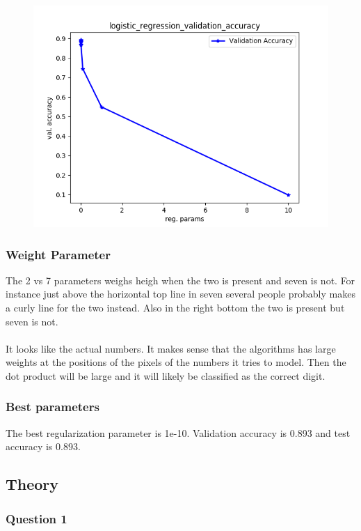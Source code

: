 \documentclass[paper=a4, fontsize=11pt]{scrartcl} %
\numberwithin{equation}{section} %
\numberwithin{figure}{section} %
\numberwithin{table}{section} %
\begin{document}
\begin{figure}[h]
\center
\includegraphics[]{logistic_regression_validation_accuracy.png}
\end{figure}

\subsubsection{Weight Parameter}
The 2 vs 7 parameters weighs heigh when the two is present and seven is not. For instance just above the horizontal top line in seven several people probably makes a curly line for the two instead. Also in the right bottom the two is present but seven is not. \\ \\
It looks like the actual numbers. It makes sense that the algorithms has large weights at the positions of the pixels of the numbers it tries to model. Then the dot product will be large and it will likely be classified as the correct digit.

\subsubsection{Best parameters}
The best regularization parameter is 1e-10. Validation accuracy is 0.893 and test accuracy is 0.893.

\subsection{Theory}

\subsubsection{Question 1}
\end{document}
